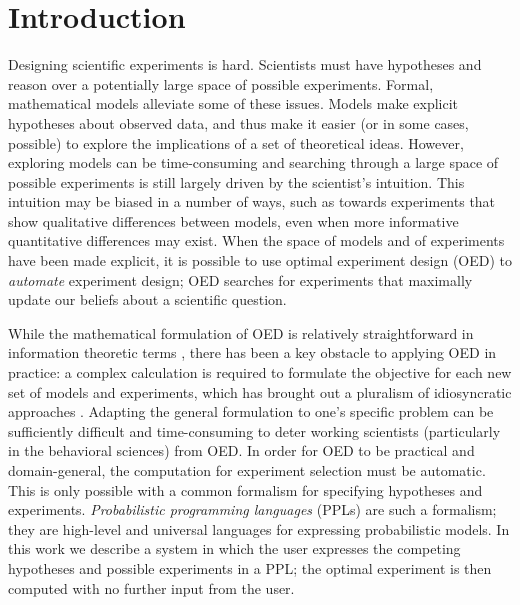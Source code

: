 \documentclass{article}
\newcommand{\ndg}[1]{\textcolor{Green}{[ndg: #1]}}
\newcommand{\lou}[1]{\textcolor{orange}{[lou: #1]}}
\begin{document}
\section{Introduction}
Designing scientific experiments is hard.
Scientists must have hypotheses and reason over a potentially large space of possible experiments.
Formal, mathematical models alleviate some of these issues.
Models make explicit hypotheses about observed data, and thus make it easier (or in some cases, possible) to explore the implications of a set of theoretical ideas.
However, exploring models can be time-consuming and searching through a large space of possible experiments is still largely driven by the scientist's intuition.
This intuition may be biased in a number of ways, such as towards experiments that show qualitative differences between models, even when more informative quantitative differences may exist.
When the space of models and of experiments have been made explicit, it is possible to use optimal experiment design (OED) to \emph{automate} experiment design; OED searches for experiments that maximally update our beliefs about a scientific question.

While the mathematical formulation of OED is relatively straightforward in information theoretic terms \cite{Lindley1956}, there has been a key obstacle to applying OED in practice: a complex calculation is required to formulate the objective for each new set of models and experiments, which has brought out a pluralism of idiosyncratic approaches \cite{Chaloner1995}.
Adapting the general formulation to one's specific problem can be sufficiently difficult and time-consuming to deter working scientists (particularly in the behavioral sciences) from OED. 
In order for OED to be practical and domain-general, the computation for experiment selection must be automatic.
This is only possible with a common formalism for specifying hypotheses and experiments.
\emph{Probabilistic programming languages} (PPLs) are such a formalism; they are high-level and universal languages for expressing probabilistic models.
In this work we describe a system in which the user expresses the competing hypotheses and possible experiments in a PPL; the optimal experiment is then computed with no further input from the user.
\end{document}
